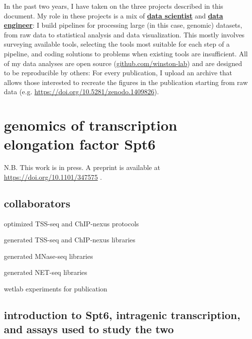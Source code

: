 \documentclass[9pt, letterpaper]{article}
\begin{document}
In the past two years, I have taken on the three projects described in this document. My role in these projects is a mix of \href{https://blog.insightdatascience.com/data-science-vs-data-engineering-62da7678adaa}{\textbf{data scientist}} and \href{https://blog.insightdatascience.com/data-science-vs-data-engineering-62da7678adaa}{\textbf{data engineer}}: I build pipelines for processing large (in this case, genomic) datasets, from raw data to statistical analysis and data visualization. This mostly involves surveying available tools, selecting the tools most suitable for each step of a pipeline, and coding solutions to problems when existing tools are insufficient. All of my data analyses are open source (\href{https://github.com/winston-lab}{github.com/winston-lab}) and are designed to be reproducible by others: For every publication, I upload an archive that allows those interested to recreate the figures in the publication starting from raw data (e.g. \url{https://doi.org/10.5281/zenodo.1409826}).

\section{genomics of transcription elongation factor Spt6}

N.B. This work is in press. A preprint is available at \url{https://doi.org/10.1101/347575} \cite{doris2018}.

\subsection{collaborators}

\begin{description}[align=right, labelwidth=5cm, noitemsep]
    \item [Steve Doris] optimized TSS-seq and ChIP-nexus protocols
    \item [] generated TSS-seq and ChIP-nexus libraries
    \item [Olga Viktorovskaya] generated MNase-seq libraries
    \item [Magdalenda Murawska] generated NET-seq libraries
    \item [Dan Spatt] wetlab experiments for publication
\end{description}

\subsection{introduction to Spt6, intragenic transcription, and assays used to study the two}
\end{document}
